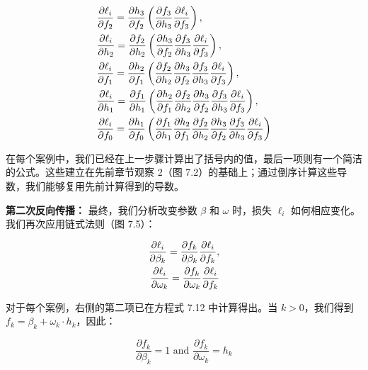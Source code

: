 \begin{align}
&\frac{\partial \ell_i}{\partial f_2} = \frac{\partial h_3}{\partial f_2} \left( \frac{\partial f_3}{\partial h_3} \frac{\partial \ell_i}{\partial f_3} \right), \notag \\
&\frac{\partial \ell_i}{\partial h_2} = \frac{\partial f_2}{\partial h_2} \left( \frac{\partial h_3}{\partial f_2} \frac{\partial f_3}{\partial h_3} \frac{\partial \ell_i}{\partial f_3} \right), \notag \\
&\frac{\partial \ell_i}{\partial f_1} = \frac{\partial h_2}{\partial f_1} \left( \frac{\partial f_2}{\partial h_2} \frac{\partial h_3}{\partial f_2} \frac{\partial f_3}{\partial h_3} \frac{\partial \ell_i}{\partial f_3} \right), \notag \\
&\frac{\partial \ell_i}{\partial h_1} = \frac{\partial f_1}{\partial h_1} \left( \frac{\partial h_2}{\partial f_1} \frac{\partial f_2}{\partial h_2} \frac{\partial h_3}{\partial f_2} \frac{\partial f_3}{\partial h_3} \frac{\partial \ell_i}{\partial f_3} \right), \notag \\
&\frac{\partial \ell_i}{\partial f_0} = \frac{\partial h_1}{\partial f_0} \left( \frac{\partial f_1}{\partial h_1} \frac{\partial h_2}{\partial f_1} \frac{\partial f_2}{\partial h_2} \frac{\partial h_3}{\partial f_2} \frac{\partial f_3}{\partial h_3} \frac{\partial \ell_i}{\partial f_3} \right) 
\end{align}

在每个案例中，我们已经在上一步骤计算出了括号内的值，最后一项则有一个简洁的公式。这些建立在先前章节观察 2（图 7.2）的基础上；通过倒序计算这些导数，我们能够复用先前计算得到的导数。


\textbf{第二次反向传播：} 最终，我们分析改变参数 \(\beta\) 和 \(\omega\) 时，损失 \(\ell_i\) 如何相应变化。我们再次应用链式法则（图 7.5）：

\begin{align}
\frac{\partial \ell_i}{\partial \beta_k} = \frac{\partial f_k}{\partial \beta_k} \frac{\partial \ell_i}{\partial f_k}, \notag \\
\frac{\partial \ell_i}{\partial \omega_k} = \frac{\partial f_k}{\partial \omega_k} \frac{\partial \ell_i}{\partial f_k} 
\end{align}

对于每个案例，右侧的第二项已在方程式 7.12 中计算得出。当 \(k > 0\)，我们得到 \(f_k = \beta_k + \omega_k \cdot h_k\)，因此：

\begin{equation}
\frac{\partial f_k}{\partial \beta_k} = 1 \text{ and } \frac{\partial f_k}{\partial \omega_k} = h_k 
\end{equation}


